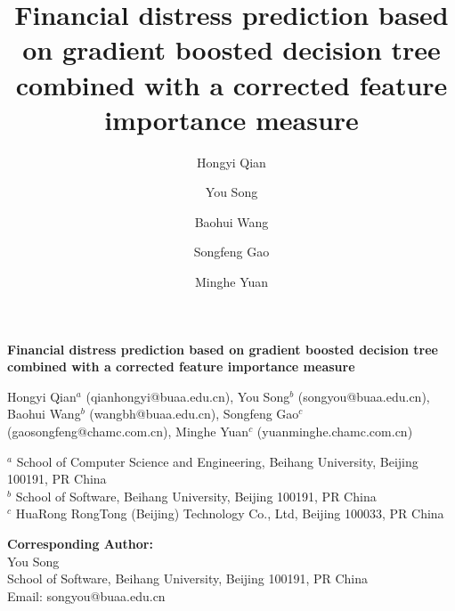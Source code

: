 \documentclass[review]{elsarticle}
\begin{document}
\begin{frontmatter}


\begin{titlepage}
\begin{center}
\vspace*{1cm}

\textbf{ \large Financial distress prediction based on gradient boosted decision tree combined with a corrected feature importance measure}

\vspace{1.5cm}

Hongyi Qian$^{a}$ (qianhongyi@buaa.edu.cn), You Song$^b$ (songyou@buaa.edu.cn), Baohui Wang$^b$ (wangbh@buaa.edu.cn), Songfeng Gao$^c$ (gaosongfeng@chamc.com.cn), Minghe Yuan$^c$ (yuanminghe.chamc.com.cn) \\

\hspace{10pt}

\begin{flushleft}
\small
$^a$ School of Computer Science and Engineering, Beihang University, Beijing 100191, PR China \\
$^b$ School of Software, Beihang University, Beijing 100191, PR China \\
$^c$ HuaRong RongTong (Beijing) Technology Co., Ltd, Beijing 100033, PR China

\vspace{1cm}
\textbf{Corresponding Author:} \\
You Song \\
School of Software, Beihang University, Beijing 100191, PR China \\
Email: songyou@buaa.edu.cn


\end{flushleft}
\end{center}
\end{titlepage}

\title{Financial distress prediction based on gradient boosted decision tree combined with a corrected feature importance measure}

\author[label1]{Hongyi Qian}

\author[label2]{You Song }

\author[label2]{Baohui Wang}

\author[label3]{Songfeng Gao}

\author[label3]{Minghe Yuan}


\end{frontmatter}
\end{document}
